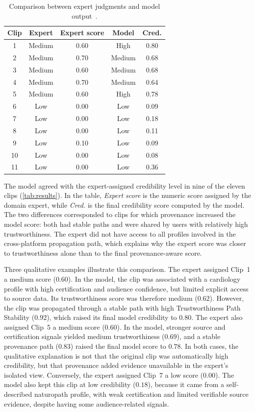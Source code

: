 \documentclass[sigconf, nonacm]{acmart}
\begin{document}
\begin{table}[t]
  \caption{Comparison between expert judgments and model output~\cite{GarciaParra2024Thesis}.}
  \label{tab:results}
  \begin{tabular}{ccccc}
    \toprule
    Clip & Expert & Expert score & Model & Cred.\\
    \midrule
    1 & Medium & 0.60 & High & 0.80\\
    2 & Medium & 0.70 & Medium & 0.68\\
    3 & Medium & 0.60 & Medium & 0.68\\
    4 & Medium & 0.70 & Medium & 0.64\\
    5 & Medium & 0.60 & High & 0.78\\
    6 & Low & 0.00 & Low & 0.09\\
    7 & Low & 0.00 & Low & 0.18\\
    8 & Low & 0.00 & Low & 0.11\\
    9 & Low & 0.10 & Low & 0.09\\
    10 & Low & 0.00 & Low & 0.08\\
    11 & Low & 0.00 & Low & 0.36\\
    \bottomrule
  \end{tabular}
\end{table}

The model agreed with the expert-assigned credibility level in nine of the
eleven clips (\autoref{tab:results}). In the table, \emph{Expert score} is the
numeric score assigned by the domain expert, while \emph{Cred.} is the final
credibility score computed by the model. The two differences corresponded to
clips for which provenance increased the model score: both had stable paths and
were shared by users with relatively high trustworthiness. The expert did not
have access to all profiles involved in the cross-platform propagation path,
which explains why the expert score was closer to trustworthiness alone than to
the final provenance-aware score.

Three qualitative examples illustrate this comparison. The expert assigned Clip~1
a medium score ($0.60$). In the model, the clip was associated with a cardiology
profile with high certification and audience confidence, but limited explicit
access to source data. Its trustworthiness score was therefore medium ($0.62$).
However, the clip was propagated through a stable path with high Trustworthiness
Path Stability ($0.92$), which raised its final model credibility to $0.80$.
The expert also assigned Clip~5 a medium score ($0.60$). In the model, stronger
source and certification signals yielded medium trustworthiness ($0.69$), and a
stable provenance path ($0.83$) raised the final model score to $0.78$. In both
cases, the qualitative explanation is not that the original clip was
automatically high credibility, but that provenance added evidence unavailable in
the expert's isolated view. Conversely, the expert assigned Clip~7 a low score
($0.00$). The model also kept this clip at low credibility ($0.18$), because it
came from a self-described naturopath profile, with weak certification and
limited verifiable source evidence, despite having some audience-related signals.
\end{document}
